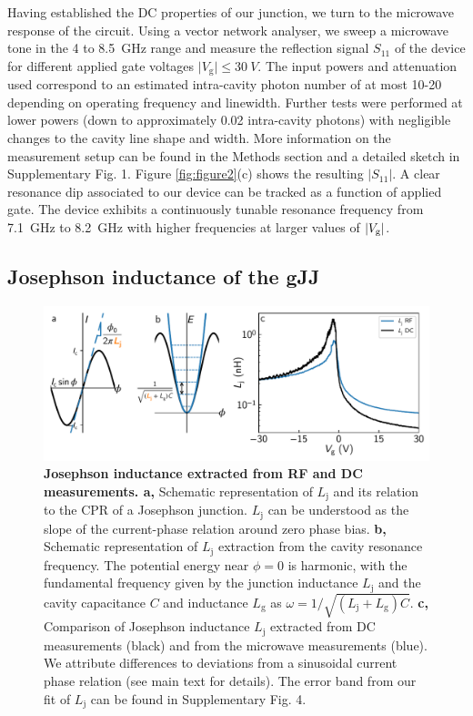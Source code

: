 Having established the DC properties of our junction, we turn to the microwave response of the circuit.
Using a vector network analyser, we sweep a microwave tone in the 4 to \SI{8.5}{GHz} range and measure the reflection signal $S_{11}$ of the device for different applied gate voltages $\lvert V_\textrm{g} \rvert \leq \SI{30}{V}$.
The input powers and attenuation used correspond to an estimated intra-cavity photon number of at most 10-20 depending on operating frequency and linewidth.
Further tests were performed at lower powers (down to approximately 0.02 intra-cavity photons) with negligible changes to the cavity line shape and width.
More information on the measurement setup can be found in the Methods section and a detailed sketch in Supplementary Fig. 1.
Figure \ref{fig:figure2}(c) shows the resulting $\lvert S_{11}\rvert$.
A clear resonance dip associated to our device can be tracked as a function of applied gate.
The device exhibits a continuously tunable resonance frequency from \SI{7.1}{GHz} to \SI{8.2}{GHz} with higher frequencies at larger values of $|V_{\rm g}|$.

\subsection{Josephson inductance of the gJJ}

\begin{figure}[thb]
	\centering
	\includegraphics[width=\linewidth]{chapter-gJJ/figs/fig3_final}
	\caption[]{\textbf{Josephson inductance extracted from RF and DC measurements. a,}
		Schematic representation of $L_\textrm{j}$ and its relation to the CPR of a Josephson junction.
		$L_\textrm{j}$ can be understood as the slope of the current-phase relation around zero phase bias.
		\textbf{b,} Schematic representation of $L_\textrm{j}$ extraction from the cavity resonance frequency.
		The potential energy near $\phi = 0$ is harmonic, with the fundamental frequency given by the junction inductance $L_\textrm{j}$ and the cavity capacitance $C$ and inductance $L_\textrm{g}$ as $\omega = 1/\sqrt{(L_\textrm{j}+L_\textrm{g})C}$.
		\textbf{c,} Comparison of Josephson inductance $L_\textrm{j}$ extracted from DC measurements (black) and from the microwave measurements (blue).
		We attribute differences to deviations from a sinusoidal current phase relation (see main text for details).
		The error band from our fit of $L_\textrm{j}$ can be found in Supplementary Fig. 4.
	}
	\label{fig:figure3}
\end{figure}

